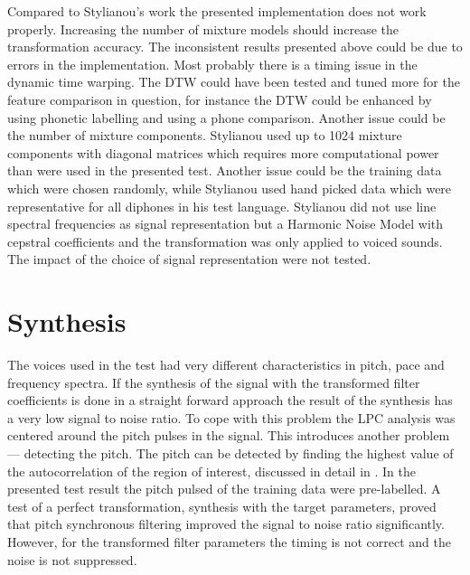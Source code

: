 Compared to Stylianou's work \cite{stylianou98} the presented implementation does not work properly. Increasing the number of mixture models should increase the transformation accuracy. The inconsistent results presented above could be due to errors in the implementation. Most probably there is a timing issue in the dynamic time warping. The DTW could have been tested and tuned more for the feature comparison in question, for instance the DTW could be enhanced by using phonetic labelling and using a phone comparison. Another issue could be the number of mixture components. Stylianou used up to 1024 mixture components with diagonal matrices which requires more computational power than were used in the presented test.  Another issue could be the training data which were chosen randomly, while Stylianou used hand picked data which were representative for all diphones in his test language. Stylianou did not use line spectral frequencies as signal representation but a Harmonic Noise Model with cepstral coefficients and the transformation was only applied to voiced sounds. The impact of the choice of signal representation were not tested.

\section{Synthesis} %
\label{sec:synthesis}
The voices used in the test had very different characteristics in pitch, pace and frequency spectra. If the synthesis of the signal with the transformed filter coefficients is done in a straight forward approach the result of the synthesis has a very low signal to noise ratio. To cope with this problem the LPC analysis was centered around the pitch pulses in the signal. This introduces another problem --- detecting the pitch. The pitch can be detected by finding the highest value of the autocorrelation of the region of interest, discussed in detail in \cite[p. 324]{taletek}. In the presented test result the pitch pulsed of the training data were pre-labelled. A test of a perfect transformation, \ie synthesis with the target parameters, proved that pitch synchronous filtering improved the signal to noise ratio significantly. However, for the transformed filter parameters the timing is not correct and the noise is not suppressed.

